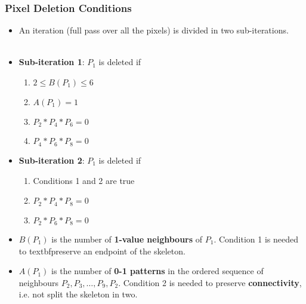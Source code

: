 \begin{frame}
  \frametitle{Pixel Deletion Conditions}
  \begin{itemize}
    \item An iteration (full pass over all the pixels) is divided in two sub-iterations.
          \\~\\
    \item \textbf{Sub-iteration 1}: $P_1$ is deleted if
          \begin{enumerate}
            \item $2 \leq B(P_1) \leq 6$
            \item $A(P_1) = 1$
            \item $P_2 * P_4 * P_6 = 0$
            \item $P_4 * P_6 * P_8 = 0$
          \end{enumerate}
          \vspace{0.3cm}
    \item \textbf{Sub-iteration 2}: $P_1$ is deleted if
          \begin{enumerate}
            \item Conditions 1 and 2 are true
            \item $P_2 * P_4 * P_8 = 0$
            \item $P_2 * P_6 * P_8 = 0$
          \end{enumerate}
          \vspace{0.3cm}
    \item $B(P_1)$ is the number of \textbf{1-value neighbours} of $P_1$. Condition 1 is needed to textbf{preserve an endpoint} of the skeleton.
    \item $A(P_1)$ is the number of \textbf{0-1 patterns} in the ordered sequence of neighbours $P_2, P_3, \dots, P_9, P_2$. Condition 2 is needed to preserve \textbf{connectivity}, i.e. not split the skeleton in two.
  \end{itemize}
\end{frame}

